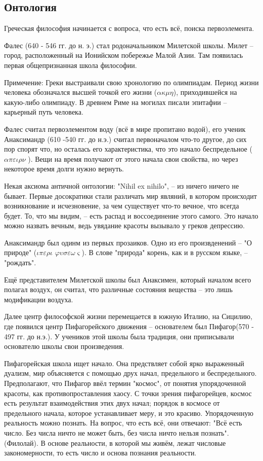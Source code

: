 \documentclass[a4paper, 12pt]{book} %
\begin{document}
\subsection{ Онтология}

Греческая философия начинается с вопроса, что есть всё, поиска первоэлемента.

Фалес (640 - 546 гг. до н. э.) стал родоначальником Милетской школы. Милет -- город, расположенный на Ионийском побережье Малой Азии. Там появилась первая общепризнанная школа философии.

Примечение: Греки выстраивали свою хронологию по олимпиадам. Период жизни человека обозначался высшей точкой его жизни ($\alpha \kappa \mu \eta$), приходившейся на какую-либо олимпиаду. В древнем Риме на могилах писали эпитафии -- карьерный путь человека.

Фалес считал первоэлементом воду (всё в мире пропитано водой), его ученик Анаксимандр (610 -540 гг. до н.э.) считал первоначалом что-то другое, до сих пор спорят что, но осталась его характеристика, что это начало беспредельное ($\alpha \pi \varepsilon \iota \rho \nu$ ). Вещи на время получают от этого начала свои свойства, но через некоторое время долги нужно вернуть.

Некая аксиома античной онтологии: "Nihil ex nihilo", -- из ничего ничего не бывает. Первые досократики стали различать мир являний, в котором происходит возникнование и исчезновение, за чем существует что-то вечное, что всегда будет. То, что мы видим, -- есть распад и воссоединение этого самого. Это начало можно назвать вечным, ведь увядание красоты вызывало у греков депрессию.

Анаксимандр был одинм из первых прозаиков. Одно из его произвденений -- "О природе" ($\iota \pi \varepsilon \rho \iota  $ $ \varphi \upsilon \sigma \varepsilon \omega \varsigma$). В слове "природа" корень, как и в русском языке, -- "рождать".

Ещё представителем Милетской школы был Анаксимен, который началом всего полагал воздух, он считал, что различные состояния вещества -- это лишь модификации воздуха. 

Далее центр философской жизни перемещается в южную Италию, на Сицилию, где появился центр Пифагорейского движения -- основателем был Пифагор(570 - 497 гг. до н.э.). У учеников этой школы была традиция, они приписывали основателю школы свои произведения.

Пифагорейская школа ищет начало. Она предствляет собой ярко выраженный дуализм, мир объясняется с помощью друх начал, предельного и беспредельного. Предполагают, что Пифагор ввёл термин "космос", от понятия упорядоченной красоты, как противопроставления хаосу. С точки зрения пифагорейцев, космос есть результат взаимодействия этих двух начал; порядок в космосе от предельного начала, которое устанавливает меру, и это красиво. Упорядоченную реальность можно познать. На вопрос, что есть всё, они отвечают: "Всё есть число. Без числа ничто не может быть, без числа ничто нельзя познать". (Филолай). В основе реальности, в которой мы живём, лежат числовые закономерности, то есть число и основа познания реальности.
\end{document}
